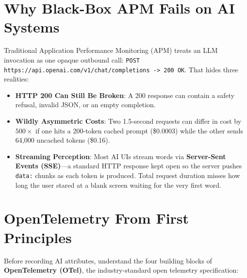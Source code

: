 \section{Why Black-Box APM Fails on AI Systems}

Traditional Application Performance Monitoring (APM) treats an LLM invocation as one opaque outbound call: \texttt{POST https://api.openai.com/v1/chat/completions -> 200 OK}. That hides three realities:
\begin{itemize}[leftmargin=18pt]
  \item \textbf{HTTP 200 Can Still Be Broken}: A 200 response can contain a safety refusal, invalid JSON, or an empty completion.
  \item \textbf{Wildly Asymmetric Costs}: Two 1.5-second requests can differ in cost by $500\times$ if one hits a 200-token cached prompt (\$0.0003) while the other sends 64,000 uncached tokens (\$0.16).
  \item \textbf{Streaming Perception}: Most AI UIs stream words via \textbf{Server-Sent Events (SSE)}—a standard HTTP response kept open so the server pushes \texttt{data:} chunks as each token is produced. Total request duration misses how long the user stared at a blank screen waiting for the very first word.
\end{itemize}

\section{OpenTelemetry From First Principles}

Before recording AI attributes, understand the four building blocks of \textbf{OpenTelemetry (OTel)}, the industry-standard open telemetry specification:


